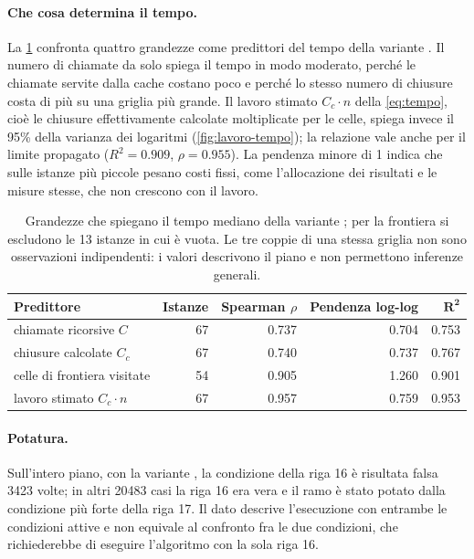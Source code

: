 \paragraph{Che cosa determina il tempo.} La \cref{tab:predittori} confronta
quattro grandezze come predittori del tempo della variante . Il
numero di chiamate da solo spiega il tempo in modo moderato, perché le
chiamate servite dalla cache costano poco e perché lo stesso numero di
chiusure costa di più su una griglia più grande. Il lavoro stimato
$C_c \cdot n$ della \cref{eq:tempo}, cioè le chiusure effettivamente
calcolate moltiplicate per le celle, spiega invece il 95\% della varianza
dei logaritmi (\cref{fig:lavoro-tempo}); la relazione vale anche per il
limite propagato ($R^2 = \num{0.909}$, $\rho = \num{0.955}$). La pendenza
minore di 1 indica che sulle istanze più piccole pesano costi fissi, come
l'allocazione dei risultati e le misure stesse, che non crescono con il
lavoro.

\begin{table}[H]
\centering
\small
\begin{tabular}{@{}l r r r r@{}}
\toprule
\textbf{Predittore} & \textbf{Istanze} & \textbf{Spearman $\rho$} & \textbf{Pendenza log-log} & $\mathbf{R^2}$ \\
\midrule
chiamate ricorsive $C$             & 67 & \num{0.737} & \num{0.704} & \num{0.753} \\
chiusure calcolate $C_c$           & 67 & \num{0.740} & \num{0.737} & \num{0.767} \\
celle di frontiera visitate        & 54 & \num{0.905} & \num{1.260} & \num{0.901} \\
lavoro stimato $C_c \cdot n$       & 67 & \num{0.957} & \num{0.759} & \num{0.953} \\
\bottomrule
\end{tabular}
\caption{Grandezze che spiegano il tempo mediano della variante ;
per la frontiera si escludono le 13 istanze in cui è vuota. Le tre coppie di
una stessa griglia non sono osservazioni indipendenti: i valori descrivono
il piano e non permettono inferenze generali.}
\label{tab:predittori}
\end{table}

\paragraph{Potatura.} Sull'intero piano, con la variante , la
condizione della riga 16 è risultata falsa \num{3423} volte; in altri
\num{20483} casi la riga 16 era vera e il ramo è stato potato dalla
condizione più forte della riga 17. Il dato descrive l'esecuzione con
entrambe le condizioni attive e non equivale al confronto fra le due
condizioni, che richiederebbe di eseguire l'algoritmo con la sola riga 16.


